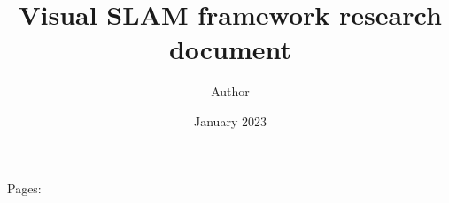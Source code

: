 \documentclass[nobib]{MSword}
\title{Visual SLAM framework research document}
\author{Author}
\date{January 2023}
\begin{document}
\maketitle
\begin{center}
    Pages: \pageref{LastPage} %
\end{center}





\end{document}
